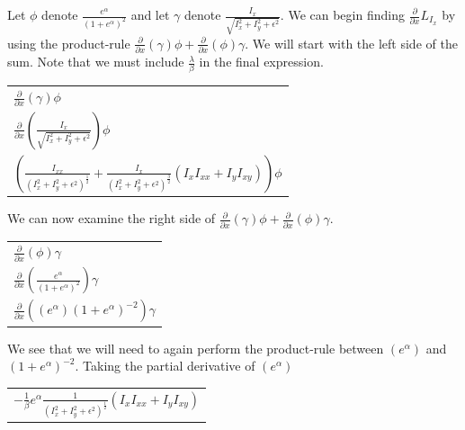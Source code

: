 \documentclass{article}
\begin{document}
    \noindent
    Let $\phi$ denote $\frac{e^\alpha}{(1+e^{\alpha})^2}$ and let $\gamma$ denote $\frac{I_{x}}{\sqrt{I_{x}^2 + I_{y}^2 + \epsilon^2}}$.
    We can begin finding $\frac{\partial}{\partial x}L_{I_{x}}$ by using the product-rule $\frac{\partial}{\partial x}(\gamma)\phi + \frac{\partial}{\partial x}(\phi)\gamma$.
    We will start with the left side of the sum. Note that we must include $\frac{\lambda}{\beta}$ in the final expression.\\
    \begin{center}
      \begin{tabular}{l}
        \vspace{12pt}
        $\frac{\partial}{\partial x}(\gamma)\phi$\\
        \vspace{12pt}
        $\frac{\partial}{\partial x}(\frac{I_{x}}{\sqrt{I_{x}^2 + I_{y}^2 + \epsilon^2}})\phi$\\
        $(\frac{I_{xx}}{(I_{x}^2 + I_{y}^2 + \epsilon^2)^\frac{1}{2}} + \frac{I_{x}}{(I_{x}^2 + I_{y}^2 + \epsilon^2)^\frac{3}{2}}(I_{x}I_{xx} + I_{y}I_{xy}))\phi$
      \end{tabular}
    \end{center}
    \vspace{12pt}
    
    \newpage
    \noindent
    We can now examine the right side of $\frac{\partial}{\partial x}(\gamma)\phi + \frac{\partial}{\partial x}(\phi)\gamma$.
    \begin{center}
      \begin{tabular}{l}
        $\frac{\partial}{\partial x}(\phi)\gamma$\\
        $\frac{\partial}{\partial x}(\frac{e^\alpha}{(1+e^{\alpha})^2})\gamma$\\
        $\frac{\partial}{\partial x}((e^\alpha)(1+e^{\alpha})^{-2})\gamma$\\
      \end{tabular}
    \end{center}

    \noindent
    We see that we will need to again perform the product-rule between $(e^\alpha)$ and\\
    $(1+e^{\alpha})^{-2}$. Taking the partial derivative of $(e^\alpha)$
    \begin{center}
      \begin{tabular}{l}
        $-\frac{1}{\beta} e^{\alpha} \frac{1}{(I_{x}^2 + I_{y}^2 + \epsilon^2)^\frac{1}{2}} (I_{x}I_{xx}+I_{y}I_{xy})$
      \end{tabular}
    \end{center}
\end{document}
